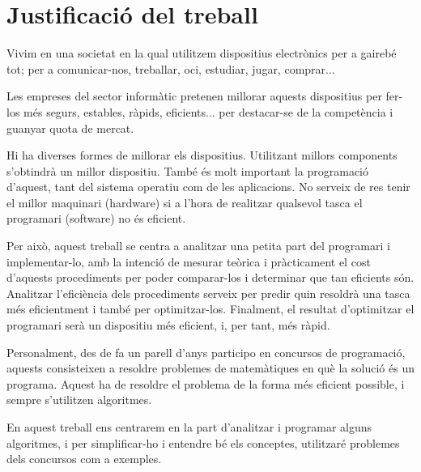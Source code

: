 \section*{Justificació del treball}
Vivim en una societat en la qual utilitzem dispositius electrònics per a gairebé tot; per a comunicar-nos, treballar, oci, estudiar, jugar, comprar... 

Les empreses del sector informàtic pretenen millorar aquests dispositius per fer-los més segurs, estables, ràpids, eficients... per destacar-se de la competència i guanyar quota de mercat. 

Hi ha diverses formes de millorar els dispositius. Utilitzant millors components s'obtindrà un millor dispositiu. També és molt important la programació d'aquest, tant del sistema operatiu com de les aplicacions. No serveix de res tenir el millor maquinari (hardware)  si a l'hora de realitzar qualsevol tasca el programari (software) no és eficient.

Per això, aquest treball se centra a analitzar una petita part del programari i implementar-lo, amb la intenció de mesurar teòrica i pràcticament el cost d'aquests procediments per poder comparar-los i determinar que tan eficients són. Analitzar l'eficiència dels procediments serveix per predir quin resoldrà una tasca més eficientment i també per optimitzar-los. Finalment, el resultat d'optimitzar el programari serà un dispositiu més eficient, i, per tant, més ràpid.

\newpage
Personalment, des de fa un parell d'anys participo en concursos de programació, aquests consisteixen a resoldre problemes de matemàtiques en què la solució és un programa. Aquest ha de resoldre el problema de la forma més eficient possible, i sempre s'utilitzen algoritmes.

En aquest treball ens centrarem en la part d'analitzar i programar alguns algoritmes, i per simplificar-ho i entendre bé els conceptes, utilitzaré problemes dels concursos com a exemples.

